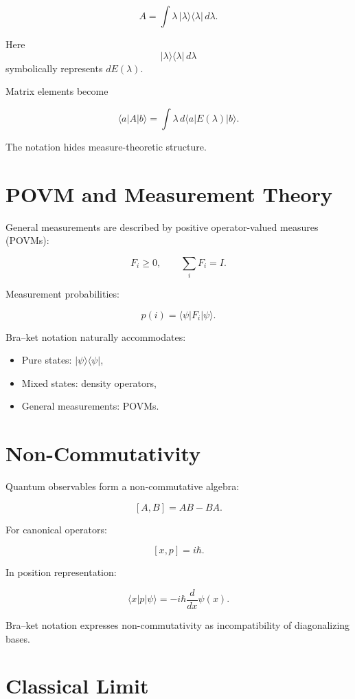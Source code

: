 \documentclass[12pt]{article}
\begin{document}
\[
A = \int \lambda\, |\lambda\rangle\langle\lambda|\, d\lambda.
\]

Here
\[
|\lambda\rangle\langle\lambda|\, d\lambda
\]
symbolically represents $dE(\lambda)$.

Matrix elements become

\[
\langle a|A|b\rangle
=
\int \lambda\, d\langle a|E(\lambda)|b\rangle.
\]

The notation hides measure-theoretic structure.

\section{POVM and Measurement Theory}

General measurements are described by positive operator-valued measures (POVMs):

\[
F_i \ge 0,
\qquad
\sum_i F_i = I.
\]

Measurement probabilities:

\[
p(i) = \langle \psi|F_i|\psi\rangle.
\]

Bra--ket notation naturally accommodates:

\begin{itemize}
\item Pure states: $|\psi\rangle\langle\psi|$,
\item Mixed states: density operators,
\item General measurements: POVMs.
\end{itemize}

\section{Non-Commutativity}

Quantum observables form a non-commutative algebra:

\[
[A,B] = AB - BA.
\]

For canonical operators:

\[
[x,p] = i\hbar.
\]

In position representation:

\[
\langle x|p|\psi\rangle = -i\hbar \frac{d}{dx}\psi(x).
\]

Bra--ket notation expresses non-commutativity as incompatibility of
diagonalizing bases.

\section{Classical Limit}
\end{document}
